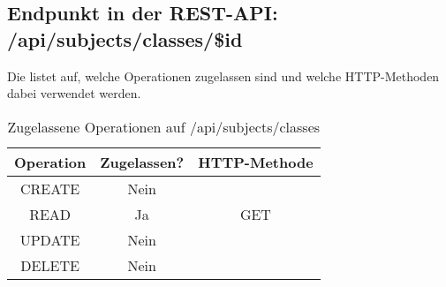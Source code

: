 \subsection{Endpunkt in der REST-API: /api/subjects/classes/\$id}
Die  listet auf, welche Operationen zugelassen sind und welche HTTP-Methoden dabei verwendet werden. 

\begin{table}[!htbp]
	\begin{tabular}{|c|c|c|}
		\hline
			\textbf{Operation} & \textbf{Zugelassen?} & \textbf{HTTP-Methode} \\ \hline
			CREATE & Nein & \\ \hline 
			READ & Ja & GET \\ \hline
			UPDATE & Nein & \\ \hline 
			DELETE & Nein & \\ \hline
	\end{tabular}

		\caption{Zugelassene Operationen auf /api/subjects/classes}
		\label{tab:end:rest:api:subjects:classes:meth}
\end{table}

